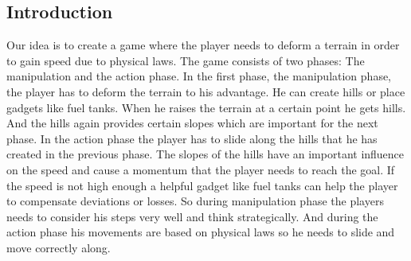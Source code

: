 \documentclass[12pt, letterpaper]{scrartcl}
\begin{document}
	\subsection{Introduction}
	Our idea is to create a game where the player needs to deform a terrain in order to gain speed due to physical laws. The game consists of two phases: The manipulation and the action phase.
	In the first phase, the manipulation phase, the player has to deform the terrain to his advantage. He can create hills or place gadgets like fuel tanks. When he raises the terrain at a certain point he gets hills. And the hills again provides certain slopes which are important for the next phase. 
	In the action phase the player has to slide along the hills that he has created in the previous phase. The slopes of the hills have an important influence on the speed and cause a momentum that the player needs to reach the goal. If the speed is not high enough a helpful gadget like fuel tanks can help the player to compensate deviations or losses.
	So during manipulation phase the players needs to consider his steps very well and think strategically. And during the action phase his movements are based on physical laws so he needs to slide and move correctly along.
	
\end{document}
